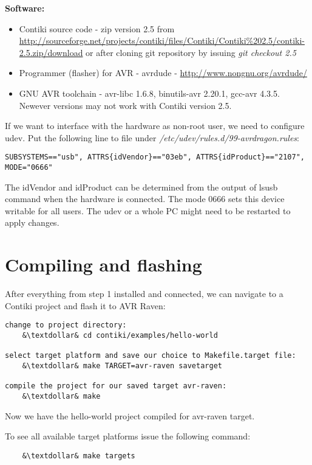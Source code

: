 \documentclass{article}
\begin{document}

\vspace{0.5cm}

{\textbf{Software:}}
\begin{itemize}
	\item Contiki source code - zip version 2.5 from\\
	\url{http://sourceforge.net/projects/contiki/files/Contiki/Contiki%202.5/contiki-2.5.zip/download}
	or after cloning git repository by issuing {\it{git checkout 2.5}}
	\item Programmer (flasher) for AVR - avrdude - \url{http://www.nongnu.org/avrdude/}
	\item GNU AVR toolchain - avr-libc 1.6.8, binutils-avr 2.20.1, gcc-avr 4.3.5.
	Newever versions may not work with Contiki version 2.5. %
\end{itemize}

If we want to interface with the hardware as non-root user, we need to configure udev.
Put the following line to file under {\it{/etc/udev/rules.d/99-avrdragon.rules}}:
\begin{lstlisting}
SUBSYSTEMS=="usb", ATTRS{idVendor}=="03eb", ATTRS{idProduct}=="2107", MODE="0666"
\end{lstlisting}
The idVendor and idProduct can be determined from the output of lsusb command when the hardware is connected.
The mode 0666 sets this device writable for all users.
The udev or a whole PC might need to be restarted to apply changes.


\section{Compiling and flashing}
After everything from step 1 installed and connected, we can navigate to a Contiki project and flash it to AVR Raven:
\begin{lstlisting}
change to project directory:
	&\textdollar& cd contiki/examples/hello-world

select target platform and save our choice to Makefile.target file:
	&\textdollar& make TARGET=avr-raven savetarget

compile the project for our saved target avr-raven:
	&\textdollar& make
\end{lstlisting}
Now we have the hello-world project compiled for avr-raven target.

To see all available target platforms issue the following command:
\begin{lstlisting}
	&\textdollar& make targets
\end{lstlisting}
\end{document}
